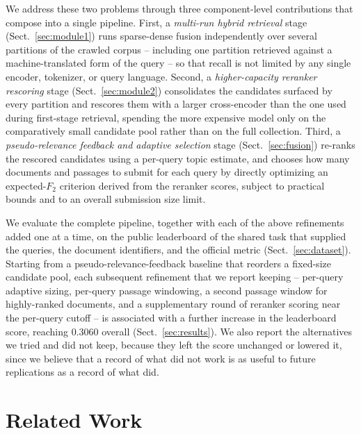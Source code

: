 \documentclass[runningheads]{llncs}
\begin{document}
We address these two problems through three component-level contributions
that compose into a single pipeline. First, a \emph{multi-run hybrid retrieval}
stage (Sect.~\ref{sec:module1}) runs sparse-dense fusion independently over
several partitions of the crawled corpus -- including one partition retrieved
against a machine-translated form of the query -- so that recall is not
limited by any single encoder, tokenizer, or query language. Second, a
\emph{higher-capacity reranker rescoring} stage (Sect.~\ref{sec:module2})
consolidates the candidates surfaced by every partition and rescores them with
a larger cross-encoder than the one used during first-stage retrieval,
spending the more expensive model only on the comparatively small candidate
pool rather than on the full collection. Third, a \emph{pseudo-relevance
feedback and adaptive selection} stage (Sect.~\ref{sec:fusion}) re-ranks the
rescored candidates using a per-query topic estimate, and chooses how many
documents and passages to submit for each query by directly optimizing an
expected-$F_2$ criterion derived from the reranker scores, subject to
practical bounds and to an overall submission size limit.

We evaluate the complete pipeline, together with each of the above
refinements added one at a time, on the public leaderboard of the shared task
that supplied the queries, the document identifiers, and the official metric
(Sect.~\ref{sec:dataset}). Starting from a pseudo-relevance-feedback baseline
that reorders a fixed-size candidate pool, each subsequent refinement that we
report keeping -- per-query adaptive sizing, per-query passage windowing, a
second passage window for highly-ranked documents, and a supplementary round
of reranker scoring near the per-query cutoff -- is associated with a
further increase in the leaderboard score, reaching 0.3060 overall
(Sect.~\ref{sec:results}). We also report the alternatives we tried and did
not keep, because they left the score unchanged or lowered it, since we
believe that a record of what did not work is as useful to future
replications as a record of what did.

\section{Related Work}
\end{document}
